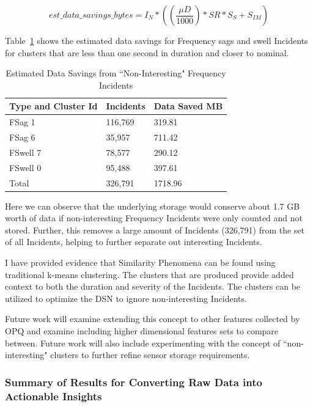 \begin{equation}
    est\_data\_savings\_bytes = I_N * ((\frac{\mu D}{1000}) * SR * S_S + S_{IM})
    \label{eq:cluster_est}
\end{equation}

Table~\ref{table:f_saved} shows the estimated data savings for Frequency sags and swell Incidents for clusters that are less than one second in duration and closer to nominal.

\begin{table}[H]
    \centering
    \caption{Estimated Data Savings from ``Non-Interesting" Frequency Incidents}
    \begin{tabularx}{\textwidth}{lll}
        \toprule
        \textbf{Type and Cluster Id} & \textbf{Incidents} &\textbf{Data Saved MB} \\
        \midrule
        FSag 1 & 116,769 & 319.81 \\
        FSag 6 & 35,957 & 711.42 \\
        FSwell 7 & 78,577 & 290.12 \\
        FSwell 0 & 95,488 & 397.61 \\
        Total & 326,791 & 1718.96 \\
        \bottomrule
    \end{tabularx}
    \label{table:f_saved}
\end{table}

Here we can observe that the underlying storage would conserve about 1.7 GB worth of data if non-interesting Frequency Incidents were only counted and not stored. Further, this removes a large amount of Incidents (326,791) from the set of all Incidents, helping to further separate out interesting Incidents.

I have provided evidence that Similarity Phenomena can be found using traditional k-means clustering. The clusters that are produced provide added context to both the duration and severity of the Incidents. The clusters can be utilized to optimize the DSN to ignore non-interesting Incidents.

Future work will examine extending this concept to other features collected by OPQ and examine including higher dimensional features sets to compare between. Future work will also include experimenting with the concept of ``non-interesting" clusters to further refine sensor storage requirements.

\subsubsection{Summary of Results for Converting Raw Data into Actionable Insights}

